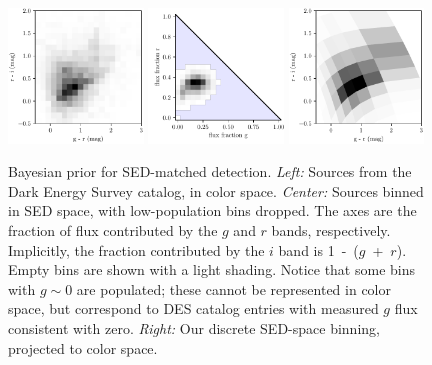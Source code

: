 \documentclass[letterpaper,preprint]{aastex62}
\begin{document}
\begin{figure}
  \begin{center}
    \includegraphics[width=0.32\textwidth]{bayes-data-cc}
    \includegraphics[width=0.32\textwidth]{bayes-prior-sed}
    \includegraphics[width=0.32\textwidth]{bayes-prior-cc}
    \caption{Bayesian prior for SED-matched detection.  \emph{Left:}
      Sources from the Dark Energy Survey catalog, in color space.
      \emph{Center:} Sources binned in SED space, with low-population
      bins dropped.  The axes are the fraction of flux contributed by
      the $g$ and $r$ bands, respectively.  Implicitly, the fraction
      contributed by the $i$ band is \mbox{1 - ($g$ + $r$).}  Empty
      bins are shown with a light shading.  Notice that some bins with
      $g \sim 0$ are populated; these cannot be represented in color
      space, but correspond to DES catalog entries with measured $g$
      flux consistent with zero.  \emph{Right:} Our discrete SED-space
      binning, projected to color space.
      \label{fig:prior}}
  \end{center}
\end{figure}
\end{document}
